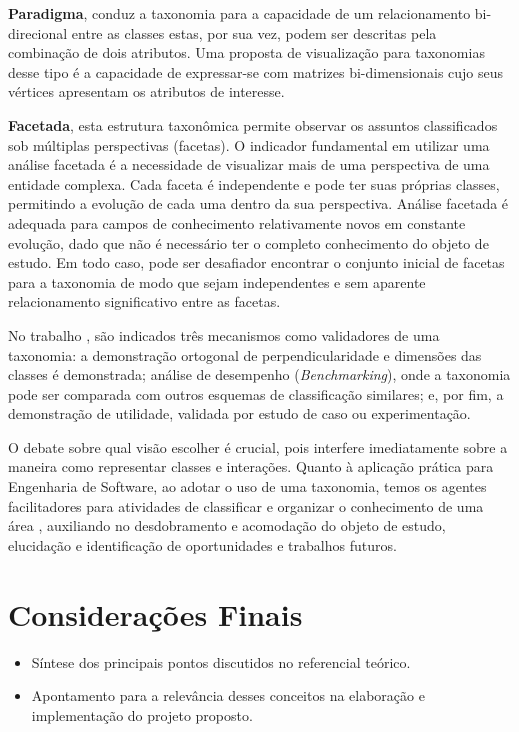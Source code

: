 \textbf{Paradigma}, conduz a taxonomia para a capacidade de um relacionamento bi-direcional entre as classes estas, por sua vez, podem ser descritas pela combinação de dois atributos. Uma proposta de visualização para taxonomias desse tipo é a capacidade de expressar-se com matrizes bi-dimensionais cujo seus vértices apresentam os atributos de interesse.

\textbf{Facetada}, esta estrutura taxonômica permite observar os assuntos classificados sob múltiplas perspectivas (facetas). O indicador fundamental em utilizar uma análise facetada é a necessidade de visualizar mais de uma perspectiva de uma entidade complexa. Cada faceta é independente e pode ter suas próprias classes, permitindo a evolução de cada uma dentro da sua perspectiva. Análise facetada é adequada para campos de conhecimento relativamente novos em constante evolução, dado que não é necessário ter o completo conhecimento do objeto de estudo. Em todo caso, pode ser desafiador encontrar o conjunto inicial de facetas para a taxonomia de modo que sejam independentes e sem aparente relacionamento significativo entre as facetas.

No trabalho \cite{smite_empirically_2014}, são indicados três mecanismos como validadores de uma taxonomia: a demonstração ortogonal de perpendicularidade e dimensões das classes é demonstrada; análise de desempenho (\textit{Benchmarking}), onde a taxonomia pode ser comparada com outros esquemas de classificação similares; e, por fim, a demonstração de utilidade, validada por estudo de caso ou experimentação.

O debate sobre qual visão escolher é crucial, pois interfere imediatamente sobre a maneira como representar classes e interações. Quanto à aplicação prática para Engenharia de Software, ao adotar o uso de uma taxonomia, temos os agentes facilitadores para atividades de classificar e organizar o conhecimento de uma área \cite{usman_taxonomies_2017}, auxiliando no desdobramento e acomodação do objeto de estudo, elucidação e identificação de oportunidades e trabalhos futuros.






\section{Considerações Finais}
 \label{cap2:consideracoesFinais}
\begin{itemize}
	\item Síntese dos principais pontos discutidos no referencial teórico.
	\item Apontamento para a relevância desses conceitos na elaboração e implementação do projeto proposto.
\end{itemize}
	

\blindtext[2]
